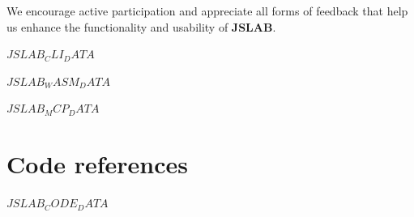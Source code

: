 \documentclass[12pt,a4paper]{article}
\begin{document}
We encourage active participation and appreciate all forms of feedback that help us enhance the functionality and usability of \textbf{JSLAB}.

$JSLAB_CLI_DATA$

$JSLAB_WASM_DATA$

$JSLAB_MCP_DATA$

\section{Code references}

$JSLAB_CODE_DATA$

\end{document}
